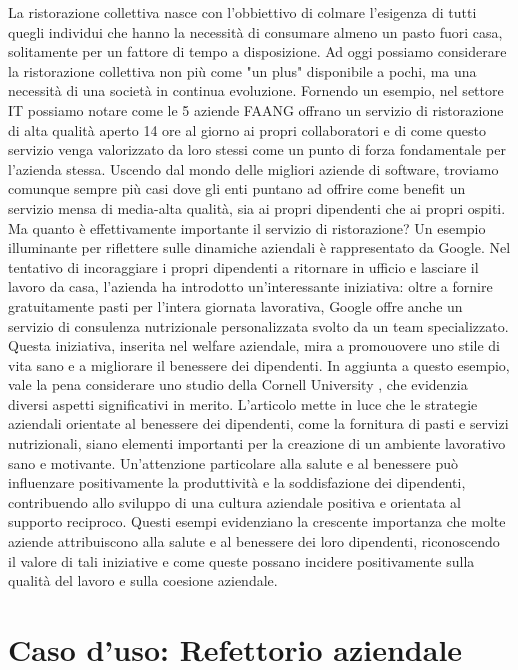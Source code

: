 \documentclass[a4paper, titlepage, 12pt, openright, oneside]{book}
\begin{document}
La ristorazione collettiva nasce con l'obbiettivo di colmare l'esigenza di tutti quegli individui
che hanno la necessità di consumare almeno un pasto fuori casa, solitamente per un fattore di tempo a disposizione.
Ad oggi possiamo considerare la ristorazione collettiva non più come "un plus" disponibile a pochi, ma una necessità di una società in continua evoluzione.
Fornendo un esempio, nel settore IT possiamo notare come le 5 aziende FAANG offrano un servizio di ristorazione di alta qualità aperto 14 ore al giorno ai propri collaboratori
e di come questo servizio venga valorizzato da loro stessi come un punto di forza fondamentale per l'azienda stessa.
\newline
Uscendo dal mondo delle migliori aziende di software, troviamo comunque sempre più casi dove gli enti puntano ad offrire come benefit un servizio mensa di media-alta qualità,
sia ai propri dipendenti che ai propri ospiti.
\newline
Ma quanto è effettivamente importante il servizio di ristorazione?
\newline
Un esempio illuminante per riflettere sulle dinamiche aziendali è rappresentato da Google. Nel tentativo di incoraggiare i propri dipendenti a ritornare in ufficio e lasciare il lavoro da casa, l'azienda ha introdotto un'interessante iniziativa: oltre a fornire gratuitamente pasti per l'intera giornata lavorativa, Google offre anche un servizio di consulenza nutrizionale personalizzata svolto da un team specializzato. Questa iniziativa, inserita nel welfare aziendale, mira a promouovere uno stile di vita sano e a migliorare il benessere dei dipendenti.
In aggiunta a questo esempio, vale la pena considerare uno studio della Cornell University \cite{cornell}, che evidenzia diversi aspetti significativi in merito. L'articolo mette in luce che le strategie aziendali orientate al benessere dei dipendenti, come la fornitura di pasti e servizi nutrizionali, siano elementi importanti per la creazione di un ambiente lavorativo sano e motivante. Un'attenzione particolare alla salute e al benessere può influenzare positivamente la produttività e la soddisfazione dei dipendenti, contribuendo allo sviluppo di una cultura aziendale positiva e orientata al supporto reciproco. Questi esempi evidenziano la crescente importanza che molte aziende attribuiscono alla salute e al benessere dei loro dipendenti, riconoscendo il valore di tali iniziative e come queste possano incidere positivamente sulla qualità del lavoro e sulla coesione aziendale.

\chapter{Caso d'uso: Refettorio aziendale}\label{chap:caso}
\end{document}
